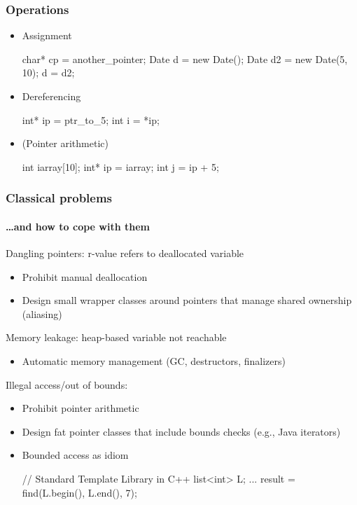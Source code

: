 \documentclass{beamer}
\begin{document}
{\begin{frame}[fragile]
\frametitle{Operations}

\begin{itemize}
\item Assignment
\begin{cplus3}
char* cp = another_pointer;
Date d = new Date();
Date d2 = new Date(5, 10);
d = d2;
\end{cplus3}

\item Dereferencing
\begin{cplus3}
int* ip = ptr_to_5;
int  i  = *ip;
\end{cplus3}

\item (Pointer arithmetic)
\begin{cplus3}
int iarray[10];
int* ip = iarray;
int j   = ip + 5;
\end{cplus3}

\end{itemize}
\end{frame}

\begin{frame}[fragile]
\frametitle{Classical problems} 
\framesubtitle{\ldots and how to cope with them}

Dangling pointers: r-value refers to deallocated variable
\begin{itemize}
\item Prohibit manual deallocation
\item Design small wrapper classes around pointers that manage shared ownership (aliasing)
\end{itemize}

Memory leakage: heap-based variable not reachable
\begin{itemize}
\item Automatic memory management (GC, destructors, finalizers)
\end{itemize}

Illegal access/out of bounds:
\begin{itemize}
\item Prohibit pointer arithmetic
\item Design fat pointer classes that include bounds checks (e.g., Java
iterators)
\item Bounded access as idiom 
\begin{cplus3}
// Standard Template Library in C++
list<int> L;
...
result = find(L.begin(), L.end(), 7);
\end{cplus3}
\end{itemize}



\end{frame}}
\end{document}

